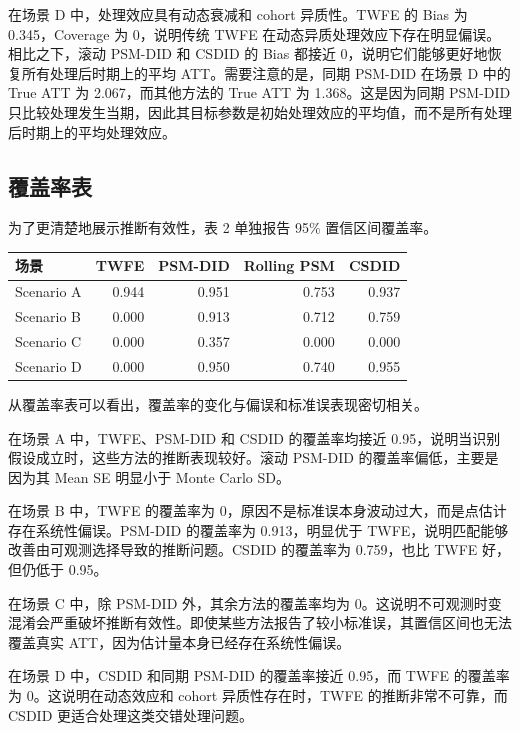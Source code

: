 \documentclass[
  fontset=windows]{ctexart}
\newcounter{none} %
\begin{document}
在场景 D 中，处理效应具有动态衰减和 cohort 异质性。TWFE 的 Bias 为
0.345，Coverage 为 0，说明传统 TWFE
在动态异质处理效应下存在明显偏误。相比之下，滚动 PSM-DID 和 CSDID 的
Bias 都接近 0，说明它们能够更好地恢复所有处理后时期上的平均
ATT。需要注意的是，同期 PSM-DID 在场景 D 中的 True ATT 为
2.067，而其他方法的 True ATT 为 1.368。这是因为同期 PSM-DID
只比较处理发生当期，因此其目标参数是初始处理效应的平均值，而不是所有处理后时期上的平均处理效应。

\subsection{覆盖率表}\label{ux8986ux76d6ux7387ux8868}

为了更清楚地展示推断有效性，表 2 单独报告 95\% 置信区间覆盖率。

{\def\LTcaptype{none} %
\begin{longtable}[]{@{}lrrrr@{}}
\toprule\noalign{}
场景 & TWFE & PSM-DID & Rolling PSM & CSDID \\
\midrule\noalign{}
\endhead
\bottomrule\noalign{}
\endlastfoot
Scenario A & 0.944 & 0.951 & 0.753 & 0.937 \\
Scenario B & 0.000 & 0.913 & 0.712 & 0.759 \\
Scenario C & 0.000 & 0.357 & 0.000 & 0.000 \\
Scenario D & 0.000 & 0.950 & 0.740 & 0.955 \\
\end{longtable}
}

从覆盖率表可以看出，覆盖率的变化与偏误和标准误表现密切相关。

在场景 A 中，TWFE、PSM-DID 和 CSDID 的覆盖率均接近
0.95，说明当识别假设成立时，这些方法的推断表现较好。滚动 PSM-DID
的覆盖率偏低，主要是因为其 Mean SE 明显小于 Monte Carlo SD。

在场景 B 中，TWFE 的覆盖率为
0，原因不是标准误本身波动过大，而是点估计存在系统性偏误。PSM-DID
的覆盖率为 0.913，明显优于
TWFE，说明匹配能够改善由可观测选择导致的推断问题。CSDID 的覆盖率为
0.759，也比 TWFE 好，但仍低于 0.95。

在场景 C 中，除 PSM-DID 外，其余方法的覆盖率均为
0。这说明不可观测时变混淆会严重破坏推断有效性。即使某些方法报告了较小标准误，其置信区间也无法覆盖真实
ATT，因为估计量本身已经存在系统性偏误。

在场景 D 中，CSDID 和同期 PSM-DID 的覆盖率接近 0.95，而 TWFE 的覆盖率为
0。这说明在动态效应和 cohort 异质性存在时，TWFE 的推断非常不可靠，而
CSDID 更适合处理这类交错处理问题。
\end{document}
